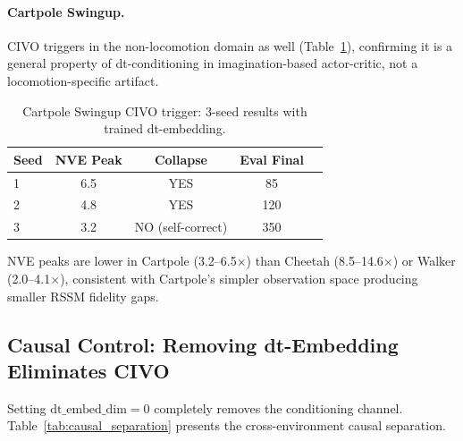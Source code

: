 \documentclass[10pt,letterpaper]{article}
\begin{document}
\paragraph{Cartpole Swingup.}
CIVO triggers in the non-locomotion domain as well (Table~\ref{tab:cartpole_civo}), confirming it is a general property of dt-conditioning in imagination-based actor-critic, not a locomotion-specific artifact.

\begin{table}[h]
\centering
\caption{Cartpole Swingup CIVO trigger: 3-seed results with trained dt-embedding.}
\label{tab:cartpole_civo}
\begin{tabular}{lcccc}
\toprule
Seed & NVE Peak & Collapse & Eval Final \\
\midrule
1 & 6.5 & YES & 85 \\
2 & 4.8 & YES & 120 \\
3 & 3.2 & NO (self-correct) & 350 \\
\bottomrule
\end{tabular}
\end{table}

NVE peaks are lower in Cartpole (3.2--6.5$\times$) than Cheetah (8.5--14.6$\times$) or Walker (2.0--4.1$\times$), consistent with Cartpole's simpler observation space producing smaller RSSM fidelity gaps.

\subsection{Causal Control: Removing dt-Embedding Eliminates CIVO}
\label{sec:causal_control}

Setting $\mathrm{dt\_embed\_dim}=0$ completely removes the conditioning channel.
Table~\ref{tab:causal_separation} presents the cross-environment causal separation.
\end{document}
